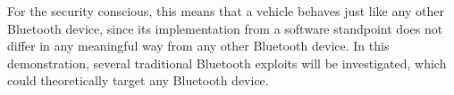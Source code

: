 \begin{itemize}


For the security conscious, this means that a vehicle behaves just like any other Bluetooth device, since its implementation from a software standpoint does not differ in any meaningful way from any other Bluetooth device. In this demonstration, several traditional Bluetooth exploits will be investigated, which could theoretically target any Bluetooth device.


\end{itemize}
